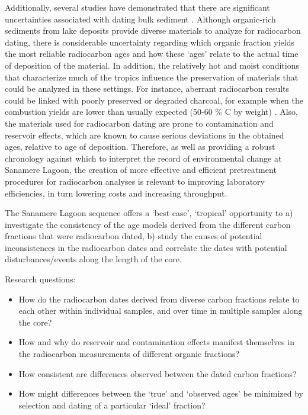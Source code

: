 \documentclass[
  12pt,
]{book}
\begin{document}
Additionally, several studies have demonstrated that there are significant uncertainties associated with dating bulk sediment \citep{bjorckHighresolution14CDated1998, wustComparisonRadiocarbonAges2008}. Although organic-rich sediments from lake deposits provide diverse materials to analyze for radiocarbon dating, there is considerable uncertainty regarding which organic fraction yields the most reliable radiocarbon ages and how these `ages' relate to the actual time of deposition of the material. In addition, the relatively hot and moist conditions that characterize much of the tropics influence the preservation of materials that could be analyzed in these settings. For instance, aberrant radiocarbon results could be linked with poorly preserved or degraded charcoal, for example when the combustion yields are lower than usually expected (50-60 \% C by weight) \citep{highamRadiocarbonDatingCharcoal2009}. Also, the materials used for radiocarbon dating are prone to contamination and reservoir effects, which are known to cause serious deviations in the obtained ages, relative to age of deposition. Therefore, as well as providing a robust chronology against which to interpret the record of environmental change at Sanamere Lagoon, the creation of more effective and efficient pretreatment procedures for radiocarbon analyses is relevant to improving laboratory efficiencies, in turn lowering costs and increasing throughput.

The Sanamere Lagoon sequence offers a `best case', `tropical' opportunity to a) investigate the consistency of the age models derived from the different carbon fractions that were radiocarbon dated, b) study the causes of potential inconsistences in the radiocarbon dates and correlate the dates with potential disturbances/events along the length of the core.

Research questions:

\begin{itemize}
\item
  How do the radiocarbon dates derived from diverse carbon fractions relate to each other within individual samples, and over time in multiple samples along the core?
\item
  How and why do reservoir and contamination effects manifest themselves in the radiocarbon measurements of different organic fractions?
\item
  How consistent are differences observed between the dated carbon fractions?
\item
  How might differences between the `true' and `observed ages' be minimized by selection and dating of a particular `ideal' fraction?
\end{itemize}
\end{document}
